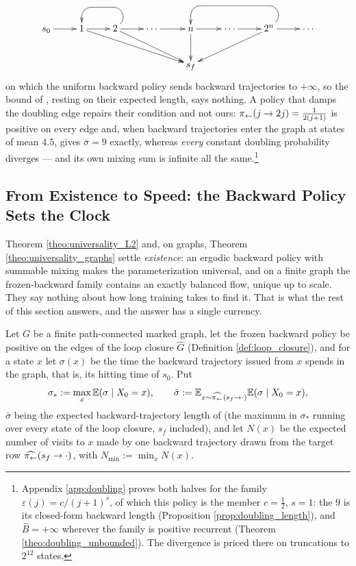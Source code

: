 \begin{equation}\label{eq:counterexample_graph}
\xymatrix{
s_0 \ar[r]& 1  \ar[drrr]\ar[r]& 2  \ar[drr] \ar `ur^l[l]`^d[l] [l]  \ar[r] & \cdots \ar[r]& n \ar[d]\ar[r]& \cdots \ar[r] & 2^n \ar `ur^l[ll]`^d[ll] [ll]  \ar[r] \ar[dll] & \cdots  \\ &&&& s_f&&
}
\end{equation}
on which the uniform backward policy sends backward trajectories to $+\infty$, so the bound of
\citet{morozov2025revisiting}, resting on their expected length, says nothing. A policy that
damps the doubling edge repairs their condition and not ours:
$\pi_{\leftarrow}(j\rightarrow 2j)=\frac{1}{2(j+1)}$ is positive on every edge and, when
backward trajectories enter the graph at states of mean $4.5$, gives $\bar\sigma=9$ exactly,
whereas \emph{every} constant doubling probability diverges --- and
its own mixing sum is infinite all the same.\footnote{Appendix \ref{app:doubling} proves both
halves for the family $\varepsilon(j)=c/(j+1)^s$, of which this policy is the member
$c=\tfrac12$, $s=1$: the $9$ is its closed-form backward length
(Proposition \ref{prop:doubling_length}), and $\widehat B=+\infty$ wherever the family is
positive recurrent (Theorem \ref{theo:doubling_unbounded}). The divergence is priced there on
truncations to $2^{12}$ states.}

\subsection{From Existence to Speed: the Backward Policy Sets the Clock}\label{sub:speed}

Theorem \ref{theo:universality_L2} and, on graphs, Theorem \ref{theo:universality_graphs}
settle \emph{existence}: an ergodic backward policy with summable mixing makes the
parameterization universal, and on a finite graph the frozen-backward family contains an
exactly balanced flow, unique up to scale. They say nothing about how long training takes to
find it. That is what the rest of this section answers, and the answer has a single currency.

Let $G$ be a finite path-connected marked graph, let the frozen backward policy be positive on the edges of the loop closure $\widehat G$ (Definition \ref{def:loop_closure}), and for a state $x$ let $\sigma(x)$ be the time the backward trajectory issued from $x$ spends in the graph, that is, its hitting time of $s_0$. Put
\begin{equation}\label{eq:morozov_variables}
    \sigma_*:=\max_x\mathbb E(\sigma\mid X_0=x),\qquad \bar\sigma:=\mathbb E_{x\sim\widehat{\pi_{\leftarrow}}(s_f\rightarrow\cdot)}\mathbb E(\sigma\mid X_0=x),
\end{equation}
$\bar\sigma$ being the expected backward-trajectory length of \citet{morozov2025revisiting} (the maximum in $\sigma_*$ running over every state of the loop closure, $s_f$ included), and let $N(x)$ be the expected number of visits to $x$ made by one backward trajectory drawn from the target row $\widehat{\pi_{\leftarrow}}(s_f\rightarrow\cdot)$, with $N_{\min}:=\min_xN(x)$.

